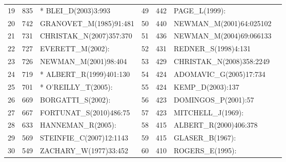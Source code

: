 \documentclass[hyperref={pdfstartview={FitBH -32768},
                         pdfpagemode=FullScreen,
                         plainpages=false,
                         colorlinks=true}
              ]{beamer}
\begin{document}
\begin{frame}[fragile]
\begin{tabular}{c|c|l||c|c|l|l}
19&   	835&   	* BLEI\_D(2003)3:993&   	49&   	442&   	PAGE\_L(1999):\\
20&   	742&   	GRANOVET\_M(1985)91:481&   	50&   	440&   	NEWMAN\_M(2001)64:025102\\
21&   	731&   	CHRISTAK\_N(2007)357:370&   	51&   	436&   	NEWMAN\_M(2004)69:066133\\
22&   	727&   	EVERETT\_M(2002):&   	52&   	431&   	REDNER\_S(1998)4:131\\
23&   	726&   	NEWMAN\_M(2001)98:404&   	53&   	429&   	CHRISTAK\_N(2008)358:2249\\
24&   	719&   	* ALBERT\_R(1999)401:130&   	54&   	424&   	ADOMAVIC\_G(2005)17:734\\
25&   	701&   	* O'REILLY\_T(2005):&   	55&   	424&   	KEMP\_D(2003):137\\
26&   	669&   	BORGATTI\_S(2002):&   	56&   	423&   	DOMINGOS\_P(2001):57\\
27&   	667&   	FORTUNAT\_S(2010)486:75&   	57&   	423&   	MITCHELL\_J(1969):\\
28&   	633&   	HANNEMAN\_R(2005):&   	58&   	415&   	ALBERT\_R(2000)406:378\\
29&   	569&   	STEINFIE\_C(2007)12:1143&   	59&   	415&   	GLASER\_B(1967):\\
30&   	549&   	ZACHARY\_W(1977)33:452&   	60&   	410&   	ROGERS\_E(1995):\\ \hline
\end{tabular}

\end{frame}
\end{document}
